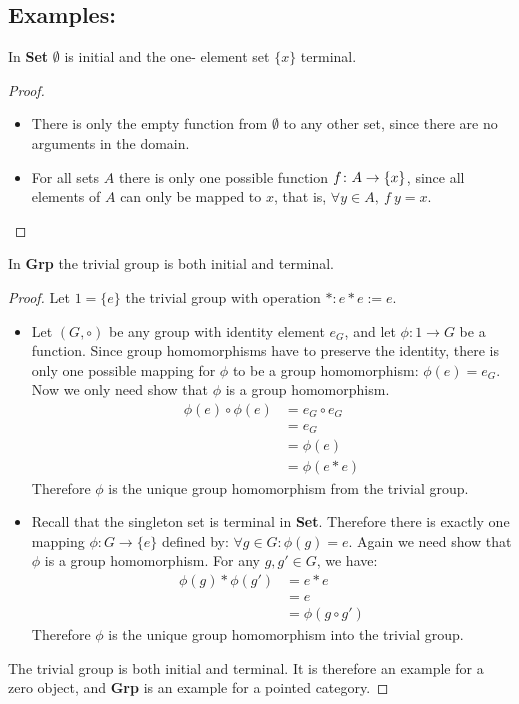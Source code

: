 \subsection {Examples:}
In \textbf{Set} $\emptyset$ is initial and the one- element set $\{x\}$ terminal.
\begin{proof}
  \
\begin {itemize}
\item There is only the empty function from $\emptyset$ to any other set, since there are no arguments in the domain.
\item For all sets $A$ there is only one possible function $f \from A \to \{x\}$, since all elements of $A$ can only be mapped
  to $x$, that is, $\forall y \in A,\ f \ y = x$.
\end{itemize}
\end{proof}
In \textbf{Grp} the trivial group is both initial and terminal.
\begin{proof}
Let $1=\{e\}$ the trivial group with operation $*: e*e := e$.
\begin {itemize}
\item Let $\left({G, \circ}\right)$ be any group with identity element $e_G$,
  and let $\phi: 1 \to G$ be a function.
  Since group homomorphisms have to preserve the identity,
  there is only one possible mapping for $\phi$ to be a group homomorphism:
  $\phi (e) = e_G$.\\
  Now we only need show that $\phi$ is a group homomorphism.
  \begin{align*}
    \phi (e) \circ \phi (e) &= e_G \circ e_G \\
                            &= e_G \\
                            &= \phi (e) \\
                            &= \phi (e * e)
  \end{align*}
  Therefore $\phi$ is the unique group homomorphism from the trivial group.
\item Recall that the singleton set is terminal in \textbf{Set}.
  Therefore there is exactly one mapping
  $\phi: G \to \{e\}$ defined by:
  $\forall g \in G: \phi(g) = e$.
  Again we need show that $\phi$ is a group homomorphism.
  For any $g, g' \in G$, we have:
  \begin{align*}
    \phi(g)*\phi(g') &= e * e \\
    &= e \\
    &= \phi (g \circ g')
  \end{align*}
  Therefore $\phi$ is the unique group homomorphism into the trivial group.
\end{itemize}
The trivial group is both initial and terminal. It is therefore an example for a
zero object, and \textbf{Grp} is an example for a pointed category.
\end{proof}
